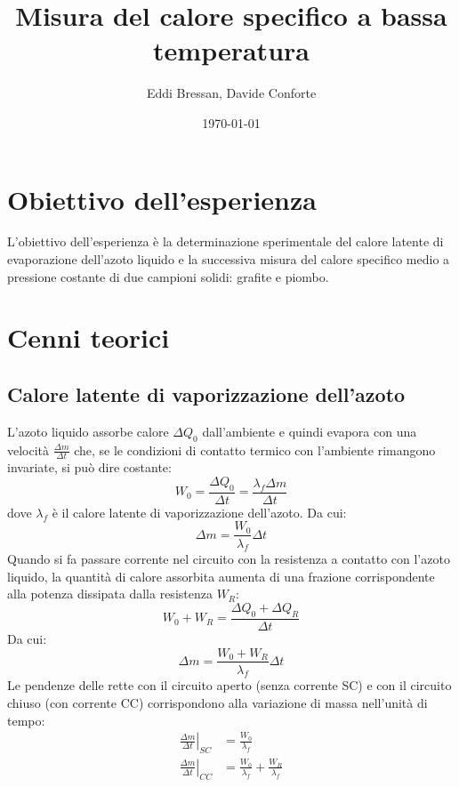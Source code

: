 \documentclass[a4paper,12pt]{article}
\title{Misura del calore specifico a bassa temperatura}
\author{Eddi Bressan, Davide Conforte}
\date{\today}
\begin{document}
\maketitle
\tableofcontents
\newpage


\section{Obiettivo dell'esperienza}

L'obiettivo dell'esperienza è la determinazione sperimentale del calore latente di evaporazione
dell'azoto liquido e la successiva misura del calore specifico medio a pressione costante di due
campioni solidi: grafite e piombo.


\section{Cenni teorici}
\subsection{Calore latente di vaporizzazione dell'azoto}

L'azoto liquido assorbe calore $\Delta Q_0$ dall'ambiente e quindi evapora con una velocità
$\frac{\Delta m }{\Delta t}$ che, se le condizioni di contatto termico con l'ambiente rimangono invariate,
si può dire costante:
\begin{equation*}
    W_0 = \frac{\Delta Q_0}{\Delta t} = \frac{\lambda_f \Delta m}{\Delta t}
\end{equation*}
dove $\lambda_f$ è il calore latente di vaporizzazione dell'azoto.
Da cui:
\begin{equation*}
    \Delta m = \frac{W_0}{\lambda_f} \Delta t
\end{equation*}
Quando si fa passare corrente nel circuito con la resistenza a contatto con l'azoto liquido, la
quantità di calore assorbita aumenta di una frazione corrispondente alla potenza dissipata dalla
resistenza $W_R$:
\begin{equation*}
    W_0 + W_R = \frac{\Delta Q_0 + \Delta Q_R}{\Delta t}
\end{equation*}
Da cui:
\begin{equation*}
    \Delta m = \frac{W_0 + W_R}{\lambda_f} \Delta t
\end{equation*}
Le pendenze delle rette con il circuito aperto (senza corrente SC) e con il circuito chiuso
(con corrente CC) corrispondono alla variazione di massa nell'unità di tempo:
\begin{align*}
    \left. \frac{\Delta m}{\Delta t} \right|_{SC} &= \frac{W_0}{\lambda_f} \\
    \left. \frac{\Delta m}{\Delta t} \right|_{CC} &= \frac{W_0}{\lambda_f} + \frac{W_R}{\lambda_f}
\end{align*}
\end{document}
